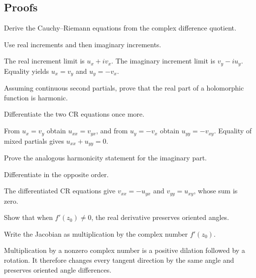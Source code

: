\subsection*{Proofs}

\begin{exercise}[Necessity of CR]\label{exr:iv02-expand-06}
Derive the Cauchy--Riemann equations from the complex difference quotient.
\end{exercise}
\begin{hint}
Use real increments and then imaginary increments.
\end{hint}
\begin{solution}
The real increment limit is \(u_x+iv_x\). The imaginary increment limit is \(v_y-iu_y\). Equality yields \(u_x=v_y\) and \(u_y=-v_x\).
\end{solution}

\begin{exercise}\label{exr:iv02-expand-07}
Assuming continuous second partials, prove that the real part of a holomorphic function is harmonic.
\end{exercise}
\begin{hint}
Differentiate the two CR equations once more.
\end{hint}
\begin{solution}
From \(u_x=v_y\) obtain \(u_{xx}=v_{yx}\), and from \(u_y=-v_x\) obtain \(u_{yy}=-v_{xy}\). Equality of mixed partials gives \(u_{xx}+u_{yy}=0\).
\end{solution}

\begin{exercise}\label{exr:iv02-expand-08}
Prove the analogous harmonicity statement for the imaginary part.
\end{exercise}
\begin{hint}
Differentiate in the opposite order.
\end{hint}
\begin{solution}
The differentiated CR equations give \(v_{xx}=-u_{yx}\) and \(v_{yy}=u_{xy}\), whose sum is zero.
\end{solution}

\begin{exercise}\label{exr:iv02-expand-09}
Show that when \(f'(z_0)\ne0\), the real derivative preserves oriented angles.
\end{exercise}
\begin{hint}
Write the Jacobian as multiplication by the complex number \(f'(z_0)\).
\end{hint}
\begin{solution}
Multiplication by a nonzero complex number is a positive dilation followed by a rotation. It therefore changes every tangent direction by the same angle and preserves oriented angle differences.
\end{solution}

